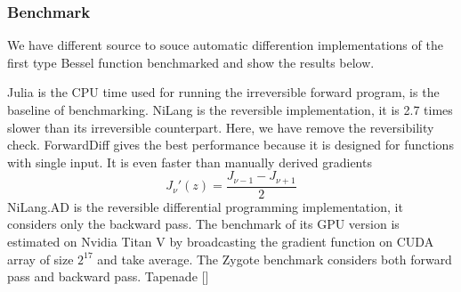\documentclass[aps,twocolumn,longbibliography,english,superscriptaddress]{revtex4-1}
\newcommand{\<}{\langle}
\renewcommand{\>}{\rangle}
\newcommand{\ra}[1]{\renewcommand{\arraystretch}{#1}}
\newcommand{\blue}[1]{[{\bf  \color{blue}{JG: #1}}]}
\theoremstyle{definition}\newtheorem{definition}{\textit{Definition}}
\begin{document}
\subsubsection{Benchmark}
We have different source to souce automatic differention implementations of the first type Bessel function benchmarked and show the results below.
\begin{table}[h!]\centering
\begin{minipage}{\columnwidth}
\ra{1.3}
    \caption{Time and space used in computing the gradients of Bessel functions $J_2(1.0)$.}\label{tbl:besselj}
\end{minipage}
\end{table}

Julia is the CPU time used for running the irreversible forward program, is the baseline of benchmarking.
NiLang is the reversible implementation, it is 2.7 times slower than its irreversible counterpart. Here, we have remove the reversibility check.
ForwardDiff gives the best performance because it is designed for functions with single input.
It is even faster than manually derived gradients
\begin{equation}
    J_{\nu}'(z) = \frac{J_{\nu-1} - J_{\nu+1}}{2}
\end{equation}
NiLang.AD is the reversible differential programming implementation, it considers only the backward pass.
The benchmark of its GPU version is estimated on Nvidia Titan V by broadcasting the gradient function on CUDA array of size $2^17$ and take average.
The Zygote benchmark considers both forward pass and backward pass.
Tapenade \blue{needs your effort, @MLS}
\end{document}
